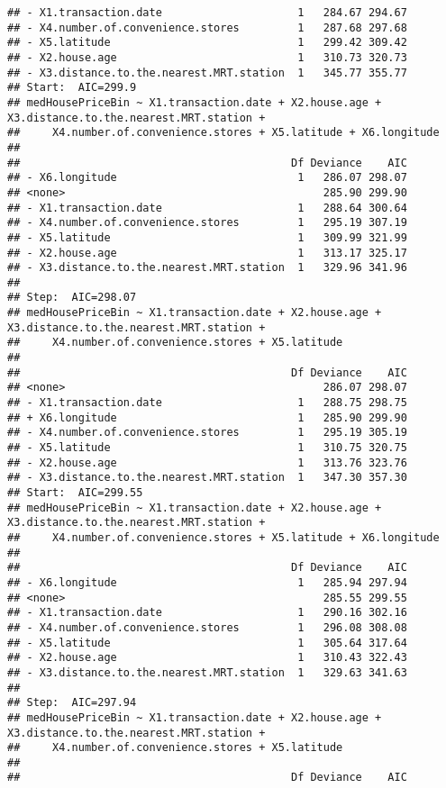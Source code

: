 \documentclass[
]{article}
\begin{document}
\begin{verbatim}
## - X1.transaction.date                     1   284.67 294.67
## - X4.number.of.convenience.stores         1   287.68 297.68
## - X5.latitude                             1   299.42 309.42
## - X2.house.age                            1   310.73 320.73
## - X3.distance.to.the.nearest.MRT.station  1   345.77 355.77
## Start:  AIC=299.9
## medHousePriceBin ~ X1.transaction.date + X2.house.age + X3.distance.to.the.nearest.MRT.station + 
##     X4.number.of.convenience.stores + X5.latitude + X6.longitude
## 
##                                          Df Deviance    AIC
## - X6.longitude                            1   286.07 298.07
## <none>                                        285.90 299.90
## - X1.transaction.date                     1   288.64 300.64
## - X4.number.of.convenience.stores         1   295.19 307.19
## - X5.latitude                             1   309.99 321.99
## - X2.house.age                            1   313.17 325.17
## - X3.distance.to.the.nearest.MRT.station  1   329.96 341.96
## 
## Step:  AIC=298.07
## medHousePriceBin ~ X1.transaction.date + X2.house.age + X3.distance.to.the.nearest.MRT.station + 
##     X4.number.of.convenience.stores + X5.latitude
## 
##                                          Df Deviance    AIC
## <none>                                        286.07 298.07
## - X1.transaction.date                     1   288.75 298.75
## + X6.longitude                            1   285.90 299.90
## - X4.number.of.convenience.stores         1   295.19 305.19
## - X5.latitude                             1   310.75 320.75
## - X2.house.age                            1   313.76 323.76
## - X3.distance.to.the.nearest.MRT.station  1   347.30 357.30
## Start:  AIC=299.55
## medHousePriceBin ~ X1.transaction.date + X2.house.age + X3.distance.to.the.nearest.MRT.station + 
##     X4.number.of.convenience.stores + X5.latitude + X6.longitude
## 
##                                          Df Deviance    AIC
## - X6.longitude                            1   285.94 297.94
## <none>                                        285.55 299.55
## - X1.transaction.date                     1   290.16 302.16
## - X4.number.of.convenience.stores         1   296.08 308.08
## - X5.latitude                             1   305.64 317.64
## - X2.house.age                            1   310.43 322.43
## - X3.distance.to.the.nearest.MRT.station  1   329.63 341.63
## 
## Step:  AIC=297.94
## medHousePriceBin ~ X1.transaction.date + X2.house.age + X3.distance.to.the.nearest.MRT.station + 
##     X4.number.of.convenience.stores + X5.latitude
## 
##                                          Df Deviance    AIC

\end{verbatim}
\end{document}
